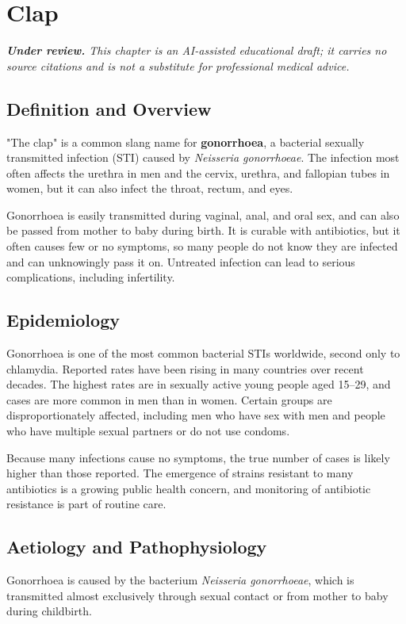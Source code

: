 \chapter{Clap}

\medskip
\noindent\textit{\textbf{Under review.} This chapter is an AI-assisted educational draft; it carries no source citations and is not a substitute for professional medical advice.}

\section*{Definition and Overview}
"The clap" is a common slang name for \textbf{gonorrhoea}, a bacterial sexually transmitted infection (STI) caused by \textit{Neisseria gonorrhoeae}. The infection most often affects the urethra in men and the cervix, urethra, and fallopian tubes in women, but it can also infect the throat, rectum, and eyes.

Gonorrhoea is easily transmitted during vaginal, anal, and oral sex, and can also be passed from mother to baby during birth. It is curable with antibiotics, but it often causes few or no symptoms, so many people do not know they are infected and can unknowingly pass it on. Untreated infection can lead to serious complications, including infertility.

\section*{Epidemiology}
Gonorrhoea is one of the most common bacterial STIs worldwide, second only to chlamydia. Reported rates have been rising in many countries over recent decades. The highest rates are in sexually active young people aged 15--29, and cases are more common in men than in women. Certain groups are disproportionately affected, including men who have sex with men and people who have multiple sexual partners or do not use condoms.

Because many infections cause no symptoms, the true number of cases is likely higher than those reported. The emergence of strains resistant to many antibiotics is a growing public health concern, and monitoring of antibiotic resistance is part of routine care.

\section*{Aetiology and Pathophysiology}
Gonorrhoea is caused by the bacterium \textit{Neisseria gonorrhoeae}, which is transmitted almost exclusively through sexual contact or from mother to baby during childbirth.

